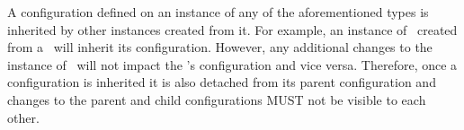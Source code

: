 A configuration defined on an instance of any of the aforementioned types is inherited by other instances created from it. For example, an instance of \Link\ created from a \Client\ will inherit its configuration. However, any additional changes to the instance of \Link\ will not impact the \Client's configuration and vice versa. Therefore, once a configuration is inherited it is also detached from its parent configuration and changes to the parent and child configurations MUST not be visible to each other.









